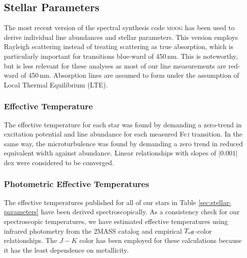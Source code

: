 \documentclass{emulateapj}
\begin{document}

\subsection{Stellar Parameters}
The most recent version of the spectral synthesis code \textsc{moog} \citep{sneden;et-al_1973} has been used to derive individual line abundances and stellar parameters. This version employs Rayleigh scattering \citep{sobeck;et-al_2011} instead of treating scattering as true absorption, which is particularly important for transitions blue-ward of 450\,nm. This is noteworthy, but is less relevant for these analyses as most of our line measurements are red-ward of 450\,nm. Absorption lines are assumed to form under the assumption of Local Thermal Equilibrium (LTE). 

\subsubsection{Effective Temperature}
\label{sec:effective-teffs}
The effective temperature for each star was found by demanding a zero-trend in excitation potential and line abundance for each measured Fe\,\textsc{i} transition. In the same way, the microturbulence was found by demanding a zero trend in reduced equivalent width against abundance. Linear relationships with slopes of $|0.001|$ dex were considered to be converged. 

\subsubsection{Photometric Effective Temperatures}
\label{sec:photometric-temperatures}

The effective temperatures published for all of our stars in Table \ref{sec:stellar-parameters} have been derived spectroscopically. As a consistency check for our spectroscopic temperatures, we have estimated effective temperatures using infrared photometry from the 2MASS catalog and empirical $T_{\rm eff}$-color relationships. The $J-K$ color has been employed for these calculations because it has the least dependence on metallicity. 
\end{document}
